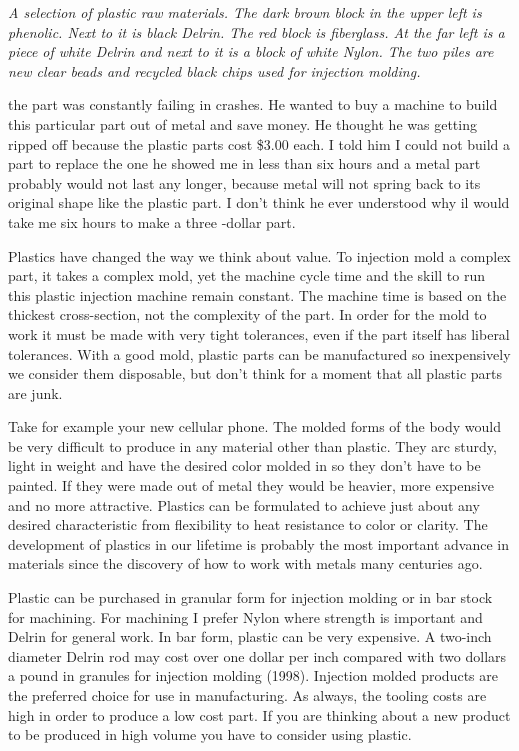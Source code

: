 \bigskip

\textit{A selection of plastic raw materials. The dark brown block in the upper
left is phenolic. Next to it is black Delrin. The red block is fiberglass. At
the far left is a piece of white Delrin and next to it is a block of white
Nylon. The two piles are new clear beads and recycled black chips used for
injection molding.}
\bigskip

the part was constantly failing in crashes. He wanted to buy a machine to build
this particular part out of metal and save money. He thought he was getting
ripped off because the plastic parts cost \$3.00 each. I told him I could not
build a part to replace the one he showed me in less than six hours and a metal
part probably would not last any longer, because metal will not spring back to
its original shape like the plastic part. I don't think he ever understood why
il would take me six hours to make a three -dollar part.

Plastics have changed the way we think about value. To injection mold a complex
part, it takes a complex mold, yet the machine cycle time and the skill to run
this plastic injection machine remain constant. The machine time is based on the
thickest cross-section, not the complexity of the part. In order for the mold to
work it must be made with very tight tolerances, even if the part itself has
liberal tolerances. With a good mold, plastic parts can be manufactured so
inexpensively we consider them disposable, but don't think for a moment that all
plastic parts are junk.

Take for example your new cellular phone. The molded forms of the body would be
very difficult to produce in any material other than plastic. They arc sturdy,
light in weight and have the desired color molded in so they don't have to be
painted. If they were made out of metal they would be heavier, more expensive
and no more attractive. Plastics can be formulated to achieve just about any
desired characteristic from flexibility to heat resistance to color or clarity.
The development of plastics in our lifetime is probably the most important
advance in materials since the discovery of how to work with metals many
centuries ago.


Plastic can be purchased in granular form for injection molding or in bar stock
for machining. For machining I prefer Nylon where strength is important and
Delrin for general work. In bar form, plastic can be very expensive. A two-inch
diameter Delrin rod may cost over one dollar per inch compared with two dollars
a pound in granules for injection molding (1998). Injection molded products are
the preferred choice for use in manufacturing. As always, the tooling costs are
high in order to produce a low cost part. If you are thinking about a new
product to be produced in high volume you have to consider using plastic.

